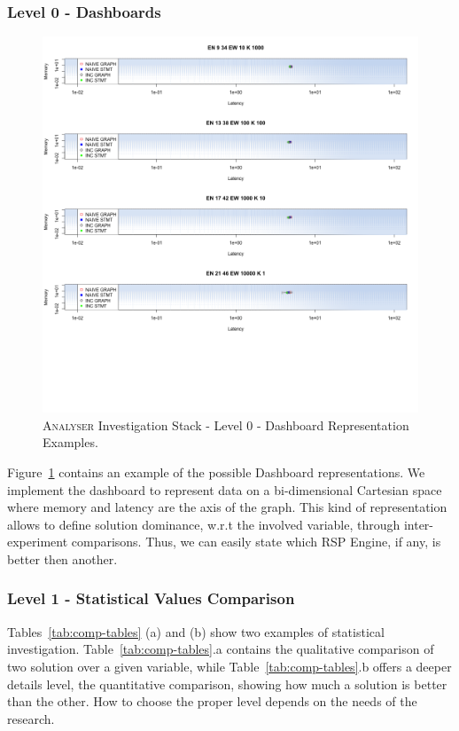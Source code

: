 \subsubsection{Level 0 - Dashboards}\label{sec:impl-level0}

\begin{figure}[h!tbp]
  \centering
	\includegraphics[width=0.6\linewidth]{images/dashboard-example}
	\caption[\textsc{Analyser} Investigation Stack - Level 0 -  Dashboard Representation Examples]{\textsc{Analyser} Investigation Stack - Level 0 -  Dashboard Representation Examples.}
  	\label{fig:dashboard-example}
\end{figure}

\noindent Figure~\ref{fig:dashboard-example} contains an example of the possible Dashboard representations. We implement the dashboard to represent data on a bi-dimensional Cartesian space where memory and latency are the axis of the graph. This kind of representation allows to define solution dominance, w.r.t the involved variable, through inter-experiment comparisons. Thus, we can easily state which RSP Engine, if any, is better then another.

\subsubsection{Level 1 - Statistical Values Comparison}\label{sec:impl-level1}

Tables~\ref{tab:comp-tables} (a) and (b) show two examples of statistical investigation. Table~\ref{tab:comp-tables}.a contains the qualitative comparison of two solution over a given variable, while Table~\ref{tab:comp-tables}.b offers a deeper details level, the quantitative comparison, showing how much a solution is better than the other. How to choose the proper level depends on the needs of the research.

